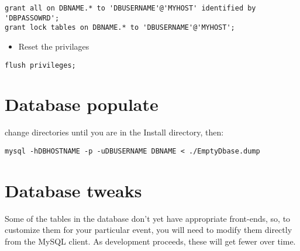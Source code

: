 \documentclass[tablesignature]{scrartcl}
\begin{document}
\begin{verbatim}
grant all on DBNAME.* to 'DBUSERNAME'@'MYHOST' identified by 'DBPASSOWRD';
grant lock tables on DBNAME.* to 'DBUSERNAME'@'MYHOST';
\end{verbatim}


\begin{itemize}
\item Reset the privilages
\end{itemize}

\begin{verbatim}
flush privileges;
\end{verbatim}
\section{Database populate}
\label{sec-5}

  change directories until you are in the Install directory, then:
\begin{verbatim}
mysql -hDBHOSTNAME -p -uDBUSERNAME DBNAME < ./EmptyDbase.dump
\end{verbatim}
\section{Database tweaks}
\label{sec-6}

  Some of the tables in the database don't yet have appropriate
  front-ends, so, to customize them for your particular event, you
  will need to modify them directly from the MySQL client.  As
  development proceeds, these will get fewer over time.
\end{document}
